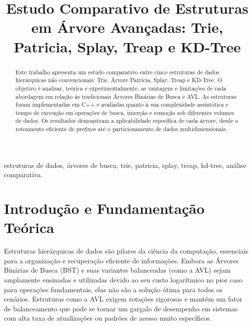 \documentclass[conference]{IEEEtran}
\begin{document}
\title{Estudo Comparativo de Estruturas em Árvore Avançadas: Trie, Patricia, Splay, Treap e KD-Tree}

\author{
}

\maketitle

\begin{abstract}
Este trabalho apresenta um estudo comparativo entre cinco estruturas de dados hierárquicas não convencionais: Trie, Árvore Patricia, Splay, Treap e KD-Tree. O objetivo é analisar, teórica e experimentalmente, as vantagens e limitações de cada abordagem em relação às tradicionais Árvores Binárias de Busca e AVL. As estruturas foram implementadas em C++ e avaliadas quanto à sua complexidade assintótica e tempo de execução em operações de busca, inserção e remoção sob diferentes volumes de dados. Os resultados demonstram a aplicabilidade específica de cada árvore, desde o roteamento eficiente de prefixos até o particionamento de dados multidimensionais.
\end{abstract}

\begin{IEEEkeywords}
estruturas de dados, árvores de busca, trie, patricia, splay, treap, kd-tree, análise comparativa.
\end{IEEEkeywords}

\section{Introdução e Fundamentação Teórica}

Estruturas hierárquicas de dados são pilares da ciência da computação, essenciais para a organização e recuperação eficiente de informações. Embora as Árvores Binárias de Busca (BST) e suas variantes balanceadas (como a AVL) sejam amplamente ensinadas e utilizadas devido ao seu custo logarítmico no pior caso para operações fundamentais, elas não são a solução ótima para todos os cenários. Estruturas como a AVL exigem rotações rigorosas e mantêm um fator de balanceamento que pode se tornar um gargalo de desempenho em sistemas com alta taxa de atualizações ou padrões de acesso muito específicos.
\end{document}
